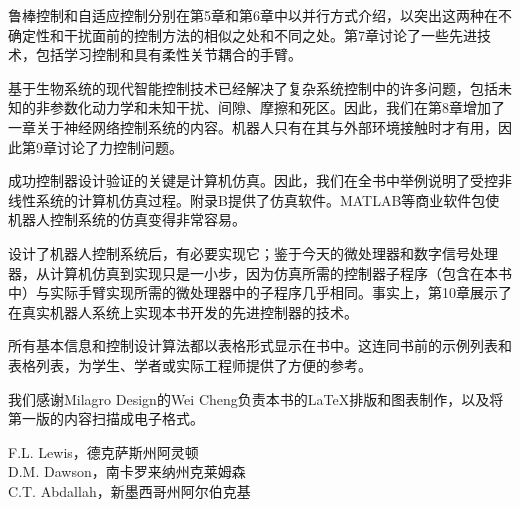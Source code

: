 \documentclass[UTF8,a4paper]{ctexart}
\begin{document}
鲁棒控制和自适应控制分别在第5章和第6章中以并行方式介绍，以突出这两种在不确定性和干扰面前的控制方法的相似之处和不同之处。第7章讨论了一些先进技术，包括学习控制和具有柔性关节耦合的手臂。

基于生物系统的现代智能控制技术已经解决了复杂系统控制中的许多问题，包括未知的非参数化动力学和未知干扰、间隙、摩擦和死区。因此，我们在第8章增加了一章关于神经网络控制系统的内容。机器人只有在其与外部环境接触时才有用，因此第9章讨论了力控制问题。

成功控制器设计验证的关键是计算机仿真。因此，我们在全书中举例说明了受控非线性系统的计算机仿真过程。附录B提供了仿真软件。MATLAB等商业软件包使机器人控制系统的仿真变得非常容易。

设计了机器人控制系统后，有必要实现它；鉴于今天的微处理器和数字信号处理器，从计算机仿真到实现只是一小步，因为仿真所需的控制器子程序（包含在本书中）与实际手臂实现所需的微处理器中的子程序几乎相同。事实上，第10章展示了在真实机器人系统上实现本书开发的先进控制器的技术。

所有基本信息和控制设计算法都以表格形式显示在书中。这连同书前的示例列表和表格列表，为学生、学者或实际工程师提供了方便的参考。

我们感谢Milagro Design的Wei Cheng负责本书的LaTeX排版和图表制作，以及将第一版的内容扫描成电子格式。

\begin{flushright}
F.L. Lewis，德克萨斯州阿灵顿\\
D.M. Dawson，南卡罗来纳州克莱姆森\\
C.T. Abdallah，新墨西哥州阿尔伯克基
\end{flushright}

\ifstandalone
  
\end{document}
